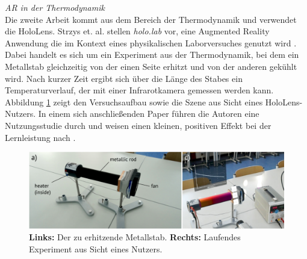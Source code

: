 \textit{AR in der Thermodynamik}\\
Die zweite Arbeit kommt aus dem Bereich der Thermodynamik und verwendet die HoloLens. Strzys et. al. stellen \textit{holo.lab} vor, eine Augmented Reality Anwendung die im Kontext eines physikalischen Laborversuches genutzt wird \cite{Strzys17}. Dabei handelt es sich um ein Experiment aus der Thermodynamik, bei dem ein Metallstab gleichzeitig von der einen Seite erhitzt und von der anderen gekühlt wird. Nach kurzer Zeit ergibt sich über die Länge des Stabes ein Temperaturverlauf, der mit einer Infrarotkamera gemessen werden kann. Abbildung \ref{img:Strzys17} zeigt den Versuchsaufbau sowie die Szene aus Sicht eines HoloLens-Nutzers. In einem sich anschließenden Paper führen die Autoren eine Nutzungsstudie durch und weisen einen kleinen, positiven Effekt bei der Lernleistung nach \cite{Strzys18}.\\

\begin{figure}[h!]
	\centering
	\includegraphics[width=1\textwidth]{images/papers/Strzys18.png}
	\caption{\textbf{Links:} Der zu erhitzende Metallstab.\textbf{ Rechts:} Laufendes Experiment aus Sicht eines Nutzers. \cite{Strzys17}}
	\label{img:Strzys17}
\end{figure}

